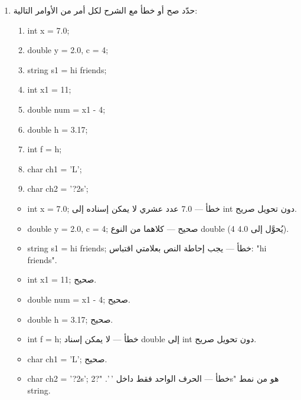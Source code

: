 ﻿\documentclass[12pt]{article}
\begin{document}
\begin{enumerate}[itemsep=2em]
\item
       حدّد صح أو خطأ مع الشرح لكل أمر من الأوامر التالية:
\begin{english}
    \begin{enumerate}
    \item \textenglish{int x = 7.0;}     \underline{\hspace{7cm}}
    \item \textenglish{double y = 2.0, c = 4;}   \underline{\hspace{7cm}}
    \item \textenglish{string s1 = hi friends;}  \underline{\hspace{7cm}}
    \item \textenglish{int x1 = 11;}  \underline{\hspace{7cm}}
    \item \textenglish{double num = x1 - 4;}   \underline{\hspace{7cm}}
    \item \textenglish{double h = 3.17;}  \underline{\hspace{7cm}}
    \item \textenglish{int f = h;}  \underline{\hspace{7cm}}
    \item \textenglish{char ch1 = 'L';}  \underline{\hspace{7cm}}
    \item \textenglish{char ch2 = '?2s';}   \underline{\hspace{7cm}}

\end{enumerate}
\end{english}

\ifwithsols
\begin{boxSolution}
\begin{itemize}
  \item \textenglish{int x = 7.0;} خطأ — \textenglish{7.0} عدد عشري لا يمكن إسناده إلى \textenglish{int} دون تحويل صريح.
  \item \textenglish{double y = 2.0, c = 4;} صحيح — كلاهما من النوع \textenglish{double} (\textenglish{4} يُحوَّل إلى \textenglish{4.0}).
  \item \textenglish{string s1 = hi friends;} خطأ — يجب إحاطة النص بعلامتي اقتباس: \textenglish{"hi friends"}.
  \item \textenglish{int x1 = 11;} صحيح.
  \item \textenglish{double num = x1 - 4;} صحيح.
  \item \textenglish{double h = 3.17;} صحيح.
  \item \textenglish{int f = h;} خطأ — لا يمكن إسناد \textenglish{double} إلى \textenglish{int} دون تحويل صريح.
  \item \textenglish{char ch1 = 'L';} صحيح.
  \item \textenglish{char ch2 = '?2s';} خطأ — الحرف الواحد فقط داخل \textenglish{'}\,\textenglish{'}. \textenglish{"?2s"} هو من نمط \textenglish{string}.
\end{itemize}
\end{boxSolution}
\fi


\end{enumerate}
\end{document}
